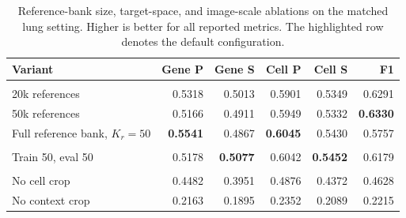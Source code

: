 \documentclass[sigconf]{acmart}
\begin{document}
\begin{table}[t]
\centering
\small
\setlength{\tabcolsep}{2.5pt}
\renewcommand{\arraystretch}{1.12}
\caption{Reference-bank size, target-space, and image-scale ablations on the matched lung setting. Higher is better for all reported metrics. The highlighted row denotes the default configuration.}
\label{tab:ablation_components}
\begin{tabularx}{\columnwidth}{@{}>{\raggedright\arraybackslash}Xrrrrr@{}}
\toprule
Variant & Gene P & Gene S & Cell P & Cell S & F1 \\
\midrule
\rowcolor{gray!15}
\multicolumn{6}{@{}l}{\emph{Reference-bank size}} \\
20k references 
& 0.5318 & 0.5013 & 0.5901 & 0.5349 & 0.6291 \\
50k references 
& 0.5166 & 0.4911 & 0.5949 & 0.5332 & \textbf{0.6330} \\
\rowcolor{blue!8}
Full reference bank, $K_r=50$
& \textbf{0.5541} & 0.4867 & \textbf{0.6045} & 0.5430 & 0.5757 \\

\rowcolor{gray!15}
\multicolumn{6}{@{}l}{\emph{Target space}} \\
Train 50, eval 50 
& 0.5178 & \textbf{0.5077} & 0.6042 & \textbf{0.5452} & 0.6179 \\

\rowcolor{gray!15}
\multicolumn{6}{@{}l}{\emph{Image scale}} \\
No cell crop 
& 0.4482 & 0.3951 & 0.4876 & 0.4372 & 0.4628 \\
No context crop 
& 0.2163 & 0.1895 & 0.2352 & 0.2089 & 0.2215 \\
\bottomrule
\end{tabularx}
\end{table}
\end{document}
